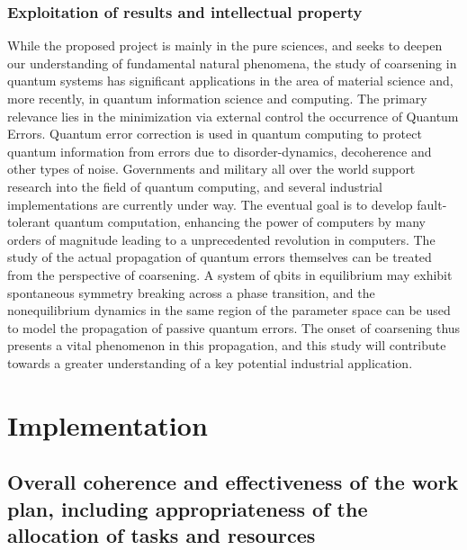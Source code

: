 \documentclass[a4paper,11pt]{article}
\begin{document}
\subsubsection{ Exploitation of results and intellectual property}
While the proposed project is mainly in the pure sciences, and seeks to deepen our understanding of fundamental natural phenomena, the study of coarsening in quantum systems has significant applications in the area of material science and, more recently, in quantum information science and computing. The primary relevance lies in the minimization via external control the occurrence of Quantum Errors. Quantum error correction is used in quantum computing to protect quantum information from errors due to disorder-dynamics, decoherence and other types of noise.  Governments and military all over the world support research into the field of quantum computing, and several industrial implementations are currently under way.  The eventual goal is to develop fault-tolerant quantum computation, enhancing the power of computers by many orders of magnitude leading to a unprecedented revolution in computers. The study of the actual propagation of quantum errors themselves can be treated from the perspective of coarsening.
 A system of qbits in equilibrium may exhibit spontaneous symmetry breaking across a phase transition, and the nonequilibrium dynamics in the same region of the parameter space can be used to model the propagation of passive quantum errors. The onset of coarsening thus presents a vital phenomenon in this propagation, and this study will contribute towards a greater understanding of a key potential industrial application.

\section{Implementation}
\label{sec:implementation}

\subsection{Overall coherence and effectiveness of the work plan,
  including appropriateness of the allocation of tasks and resources}
\label{sec:impl-coherence}
\end{document}
